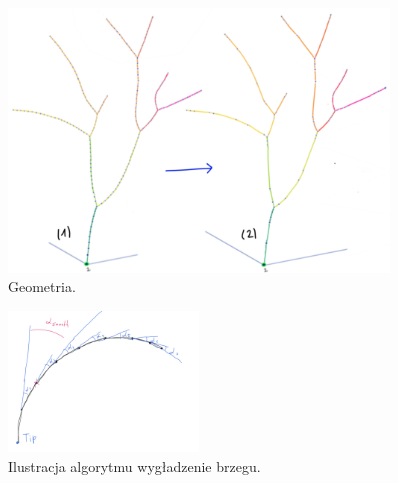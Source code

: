 \documentclass[]{pracamgr}
\begin{document}
      \begin{figure}[H]
        \centering
        \includegraphics[width=0.9\textwidth]{figs/tree_coarsening.png}        
        \caption {Geometria.}
        \label{tree_coarsening}
      \end{figure}

      \begin{figure}
        \begin{center}
          \vspace{-20pt}
          \includegraphics[width=0.45\textwidth]{figs/descritization_reducing.jpg}
        \end{center}
        \caption {Ilustracja algorytmu wygładzenie brzegu.}
        \label{descritization_reducing}
      \end{figure}
\end{document}
